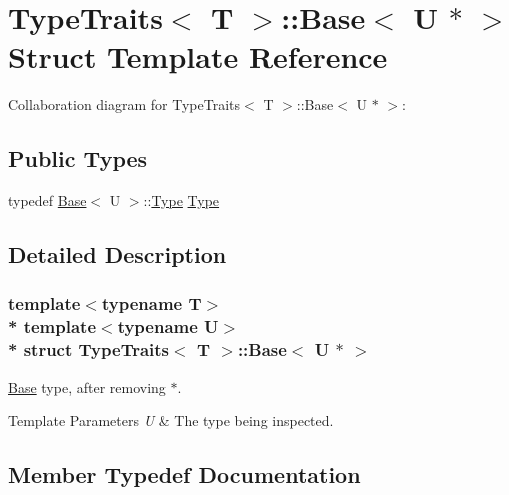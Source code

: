 \hypertarget{structTypeTraits_1_1Base_3_01U_01_5_01_4}{}\section{Type\+Traits$<$ T $>$\+:\+:Base$<$ U $\ast$ $>$ Struct Template Reference}
\label{structTypeTraits_1_1Base_3_01U_01_5_01_4}


Collaboration diagram for Type\+Traits$<$ T $>$\+:\+:Base$<$ U $\ast$ $>$\+:
\subsection*{Public Types}
\begin{DoxyCompactItemize}
\item 
typedef \hyperlink{structTypeTraits_1_1Base}{Base}$<$ U $>$\+::\hyperlink{structTypeTraits_1_1Base_3_01U_01_5_01_4_a93f6a7c331938348b7ea3fa82de9a0b6}{Type} \hyperlink{structTypeTraits_1_1Base_3_01U_01_5_01_4_a93f6a7c331938348b7ea3fa82de9a0b6}{Type}
\end{DoxyCompactItemize}


\subsection{Detailed Description}
\subsubsection*{template$<$typename T$>$\\*
template$<$typename U$>$\\*
struct Type\+Traits$<$ T $>$\+::\+Base$<$ U $\ast$ $>$}

\hyperlink{structTypeTraits_1_1Base}{Base} type, after removing {\ttfamily $\ast$}. 
\begin{DoxyTemplParams}{Template Parameters}
{\em U} & The type being inspected. \\
\hline
\end{DoxyTemplParams}


\subsection{Member Typedef Documentation}
